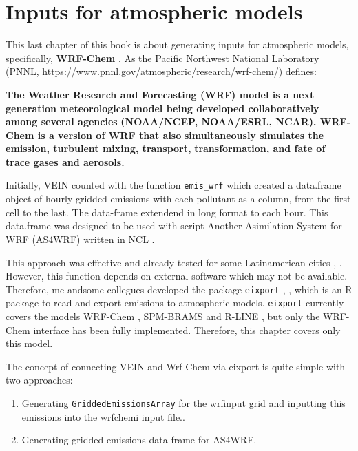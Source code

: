\documentclass[12pt,graybox,envcountchap,sectrefs]{krantz}
\providecommand{\tightlist}{%
  \setlength{\itemsep}{0pt}\setlength{\parskip}{0pt}}
\theoremstyle{definition}
\theoremstyle{definition}
\theoremstyle{definition}
\theoremstyle{remark}
\begin{document}
\chapter{Inputs for atmospheric models}\label{ep}

This last chapter of this book is about generating inputs for
atmospheric models, specifically, \textbf{WRF-Chem}
\citep{Grelletal2005}. As the Pacific Northwest National Laboratory
(PNNL, \url{https://www.pnnl.gov/atmospheric/research/wrf-chem/})
defines:

\textbf{The Weather Research and Forecasting (WRF) model is a next
generation } \textbf{meteorological model being developed
collaboratively among several agencies} \textbf{(NOAA/NCEP, NOAA/ESRL,
NCAR). WRF-Chem is a version of WRF that also} \textbf{simultaneously
simulates the emission, turbulent mixing, transport,}
\textbf{transformation, and fate of trace gases and aerosols.}

Initially, VEIN counted with the function \texttt{emis\_wrf} which
created a data.frame object of hourly gridded emissions with each
pollutant as a column, from the first cell to the last. The data-frame
extendend in long format to each hour. This data.frame was designed to
be used with script Another Asimilation System for WRF (AS4WRF)
\citep{VaraVelaetal2015} written in NCL \citep{ncl}.

This approach was effective and already tested for some Latinamerican
cities \citep{micro}, \citep{icshmo}. However, this function depends on
external software which may not be available. Therefore, me andsome
collegues developed the package \texttt{eixport} \citep{eixport},
\citep{eixport2}, which is an R package to read and export emissions to
atmospheric models. \texttt{eixport} currently covers the models
WRF-Chem \citep{Grelletal2005}, SPM-BRAMS \citep{Freitasetal2005} and
R-LINE \citep{rline}, but only the WRF-Chem interface has been fully
implemented. Therefore, this chapter covers only this model.

The concept of connecting VEIN and Wrf-Chem via eixport is quite simple
with two approaches:

\begin{enumerate}
\def\labelenumi{\arabic{enumi}.}
\tightlist
\item
  Generating \texttt{GriddedEmissionsArray} for the wrfinput grid and
  inputting this emissions into the wrfchemi input file..
\item
  Generating gridded emissions data-frame for AS4WRF.
\end{enumerate}
\end{document}
